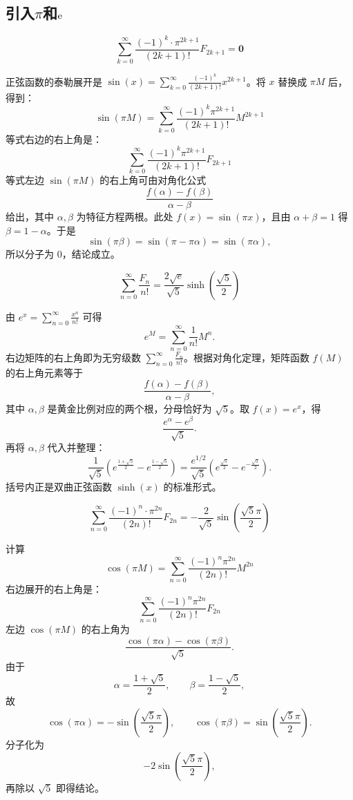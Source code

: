 \subsection{\texorpdfstring{引入$\pi$和$\mathrm{e}$}{引入π和e}}
\begin{conclusion}
\[\sum_{k=0}^\infty \frac{(-1)^k \cdot \pi^{2k+1}}{(2k+1)!} F_{2k+1} = \mathbf{0} \]
\end{conclusion}
正弦函数的泰勒展开是 $\sin(x) = \sum_{k=0}^\infty \frac{(-1)^k}{(2k+1)!} x^{2k+1}$。将 $x$ 替换成 $\pi M$ 后，得到：
$$ \sin(\pi M) = \sum_{k=0}^\infty \frac{(-1)^k \pi^{2k+1}}{(2k+1)!} M^{2k+1} $$
等式右边的右上角是：\[\sum_{k=0}^\infty \frac{(-1)^k \pi^{2k+1}}{(2k+1)!} F_{2k+1}\]
等式左边 $\sin(\pi M)$ 的右上角可由对角化公式
\[
\frac{f(\alpha)-f(\beta)}{\alpha-\beta}
\]
给出，其中 \(\alpha,\beta\) 为特征方程两根。此处 \(f(x)=\sin(\pi x)\)，且由 \(\alpha+\beta=1\) 得 \(\beta=1-\alpha\)。于是
\[
\sin(\pi\beta)=\sin(\pi-\pi\alpha)=\sin(\pi\alpha),
\]
所以分子为 \(0\)，结论成立。

\begin{conclusion}
\[\sum_{n=0}^\infty \frac{F_n}{n!} = \frac{2\sqrt{e}}{\sqrt{5}} \sinh\left(\frac{\sqrt{5}}{2}\right) \]
\end{conclusion}
由 $e^x = \sum_{n=0}^\infty \frac{x^n}{n!}$ 可得
\[
e^M = \sum_{n=0}^\infty \frac{1}{n!} M^n.
\]
右边矩阵的右上角即为无穷级数 $\sum_{n=0}^\infty \frac{F_n}{n!}$。根据对角化定理，矩阵函数 $f(M)$ 的右上角元素等于
\[
\frac{f(\alpha) - f(\beta)}{\alpha - \beta},
\]
其中 \(\alpha,\beta\) 是黄金比例对应的两个根，分母恰好为 \(\sqrt{5}\)。取 \(f(x)=e^x\)，得
\[
\frac{e^\alpha - e^\beta}{\sqrt{5}}.
\]
再将 \(\alpha,\beta\) 代入并整理：
\[
\frac{1}{\sqrt{5}} \left( e^{\frac{1+\sqrt{5}}{2}} - e^{\frac{1-\sqrt{5}}{2}} \right) = \frac{e^{1/2}}{\sqrt{5}} \left( e^{\frac{\sqrt{5}}{2}} - e^{-\frac{\sqrt{5}}{2}} \right).
\]
括号内正是双曲正弦函数 \(\sinh(x)\) 的标准形式。

\begin{conclusion}
\[\sum_{n=0}^\infty \frac{(-1)^n \cdot \pi^{2n}}{(2n)!} F_{2n} = -\frac{2}{\sqrt{5}} \sin\left(\frac{\sqrt{5}\pi}{2}\right)\]
\end{conclusion}
计算$$ \cos(\pi M) = \sum_{n=0}^\infty \frac{(-1)^n \pi^{2n}}{(2n)!} M^{2n} $$
右边展开的右上角是：\[\sum_{n=0}^\infty \frac{(-1)^n \pi^{2n}}{(2n)!} F_{2n}\]
左边 \(\cos(\pi M)\) 的右上角为
\[
\frac{\cos(\pi \alpha) - \cos(\pi \beta)}{\sqrt{5}}.
\]
由于
\[
\alpha = \frac{1+\sqrt{5}}{2},\qquad \beta = \frac{1-\sqrt{5}}{2},
\]
故
\[
\cos(\pi \alpha) = -\sin\left(\frac{\sqrt{5}\pi}{2}\right),\qquad
\cos(\pi \beta) = \sin\left(\frac{\sqrt{5}\pi}{2}\right).
\]
分子化为
\[
-2\sin\left(\frac{\sqrt{5}\pi}{2}\right),
\]
再除以 \(\sqrt5\) 即得结论。


